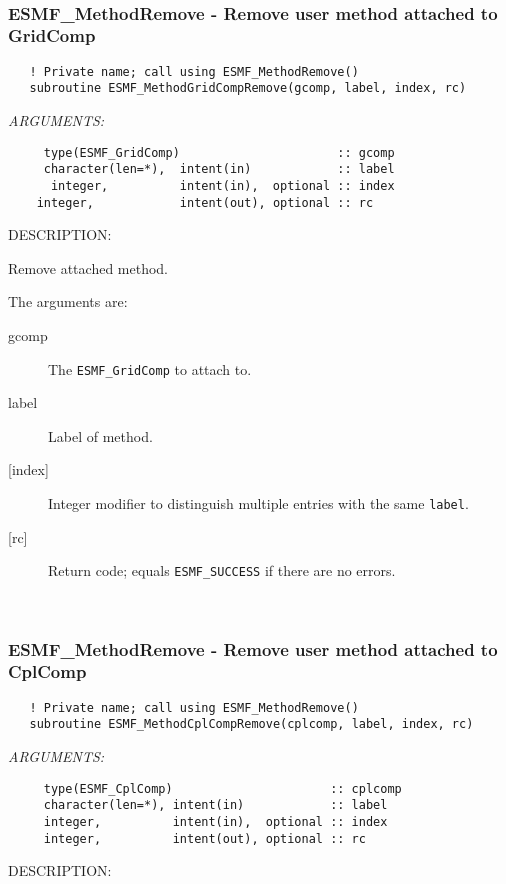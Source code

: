  
\mbox{}\hrulefill\ 
 
\subsubsection [ESMF\_MethodRemove] {ESMF\_MethodRemove - Remove user method attached to GridComp}


  
\begin{verbatim}   ! Private name; call using ESMF_MethodRemove()
   subroutine ESMF_MethodGridCompRemove(gcomp, label, index, rc)\end{verbatim}{\em ARGUMENTS:}
\begin{verbatim}     type(ESMF_GridComp)                      :: gcomp
     character(len=*),  intent(in)            :: label
      integer,          intent(in),  optional :: index
    integer,            intent(out), optional :: rc \end{verbatim}
{\sf DESCRIPTION:\\ }


   Remove attached method.
  
   The arguments are:
   \begin{description}
   \item[gcomp]
     The {\tt ESMF\_GridComp} to attach to.
   \item[label]
     Label of method.
   \item[{[index]}]
     Integer modifier to distinguish multiple entries with the same {\tt label}.
   \item[{[rc]}]
     Return code; equals {\tt ESMF\_SUCCESS} if there are no errors.
   \end{description}
   
 
\mbox{}\hrulefill\ 
 
\subsubsection [ESMF\_MethodRemove] {ESMF\_MethodRemove - Remove user method attached to CplComp}


  
\begin{verbatim}   ! Private name; call using ESMF_MethodRemove()
   subroutine ESMF_MethodCplCompRemove(cplcomp, label, index, rc)\end{verbatim}{\em ARGUMENTS:}
\begin{verbatim}     type(ESMF_CplComp)                      :: cplcomp
     character(len=*), intent(in)            :: label
     integer,          intent(in),  optional :: index
     integer,          intent(out), optional :: rc \end{verbatim}
{\sf DESCRIPTION:\\ }


